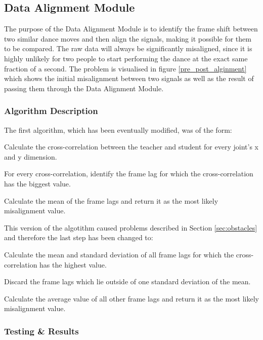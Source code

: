 \documentclass[11pt,a4paper]{article}
\begin{document}
\clearpage
\subsection{Data Alignment Module}
\noindent
The purpose of the Data Alignment Module is to identify the frame shift between two similar dance moves and then align the signals, making it possible for them to be compared. The raw data will always be significantly misaligned, since it is highly unlikely for two people to start performing the dance at the exact same fraction of a second. The problem is visualised in figure \ref{pre_post_alginment} which shows the initial misalignment between two signals as well as the result of passing them through the Data Alignment Module.

\subsubsection{Algorithm Description}
\noindent
The first algorithm, which has been eventually modified, was of the form:
\begin{compactitem}
\setlength{\itemsep}{1pt}
\setlength{\parskip}{0pt}
\setlength{\parsep}{0pt}
	\item Calculate the cross-correlation between the teacher and student for every joint's x and y dimension.
	\item For every cross-correlation, identify the frame lag for which the cross-correlation has the biggest value.
	\item Calculate the mean of the frame lags and return it as the most likely misalignment value.
\end{compactitem}
This version of the algotithm caused problems described in Section \ref{sec:obstacles} and therefore the last step has been changed to:
\begin{compactitem}
\setlength{\itemsep}{1pt}
\setlength{\parskip}{0pt}
\setlength{\parsep}{0pt}
	\item Calculate the mean and standard deviation of all frame lags for which the cross-correlation has the highest value.
	\item Discard the frame lags which lie outside of one standard deviation of the mean.
	\item Calculate the average value of all other frame lags and return it as the most likely misalignment value.
\end{compactitem}

\subsubsection{Testing \& Results}
\end{document}
